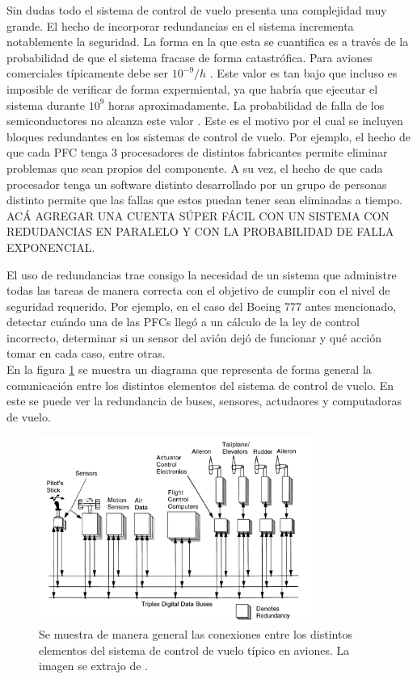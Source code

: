 Sin dudas todo el sistema de control de vuelo presenta una complejidad muy grande. El hecho de incorporar redundancias en el sistema incrementa notablemente la seguridad. La forma en la que esta se cuantifica es a través de la probabilidad de que el sistema fracase de forma catastrófica. Para aviones comerciales típicamente debe ser $10^{-9}/h$ \cite[p.~217]{collinson2023introduction}. Este valor es tan bajo que incluso es imposible de verificar de forma expermiental, ya que habría que ejecutar el sistema durante $10^9$ horas aproximadamente. La probabilidad de falla de los semiconductores no alcanza este valor \cite[p.~272]{kopetz-2011}. Este es el motivo por el cual se incluyen bloques redundantes en los sistemas de control de vuelo. Por ejemplo, el hecho de que cada PFC tenga 3 procesadores de distintos fabricantes permite eliminar problemas que sean propios del componente. A su vez, el hecho de que cada procesador tenga un software distinto desarrollado por un grupo de personas distinto permite que las fallas que estos puedan tener sean eliminadas a tiempo.\\

{\color{red} ACÁ AGREGAR UNA CUENTA SÚPER FÁCIL CON UN SISTEMA CON REDUDANCIAS EN PARALELO Y CON LA PROBABILIDAD DE FALLA EXPONENCIAL}.

El uso de redundancias trae consigo la necesidad de un sistema que administre todas las tareas de manera correcta con el objetivo de cumplir con el nivel de seguridad requerido. Por ejemplo, en el caso del Boeing 777 antes mencionado, detectar cuándo una de las PFCs llegó a un cálculo de la ley de control incorrecto, determinar si un sensor del avión dejó de funcionar y qué acción tomar en cada caso, entre otras.\\

En la figura \ref{fig:diagrama_general_fly_by_wire} se muestra un diagrama que representa de forma general la comunicación entre los distintos elementos del sistema de control de vuelo. En este se puede ver la redundancia de buses, sensores, actudaores y computadoras de vuelo.

\begin{figure}[H]
    \centering
    \includegraphics[width=0.8\textwidth]{img/diagrama_general_fly_by_wire.png}
    \caption{Se muestra de manera general las conexiones entre los distintos elementos del sistema de control de vuelo típico en aviones. La imagen se extrajo de \cite{collinson2023introduction}.}
    \label{fig:diagrama_general_fly_by_wire}    
\end{figure}

